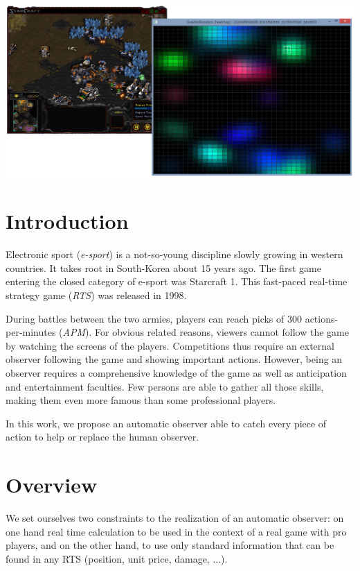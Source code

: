 \documentclass{jfsma}
\begin{document}
	\maketitle
	
	\begin{strip}
  \centering\noindent
  \includegraphics[scale=0.35]{gfx/GB}
\end{strip}

	\section{Introduction}
    	Electronic sport (\textit{e-sport}) is a not-so-young discipline slowly growing in western countries.
        It takes root in South-Korea about 15 years ago. 
        The first game entering the closed category of e-sport was Starcraft 1. %
        This fast-paced real-time strategy game (\textit{RTS}) was released in 1998.
        
        During battles between the two armies, players can reach picks of 300 actions-per-minutes (\textit{APM}).
        For obvious related reasons, viewers cannot follow the game by watching the screens of the players.
        Competitions thus require an external observer following the game and showing important actions.
        However, being an observer requires a comprehensive knowledge of the game as well as anticipation and entertainment faculties. 
        Few persons are able to gather all those skills, making them even more famous than some professional players.
        
        \medskip
        In this work, we propose an automatic observer able to catch every piece of action to help or replace the human observer.
        
\section{Overview}
We set ourselves two constraints to the realization of an automatic observer: on one hand real time calculation to be used in the context of a real game with pro players, and on the other hand, to use only standard information that can be found in any RTS (position, unit price, damage, ...).
\end{document}
